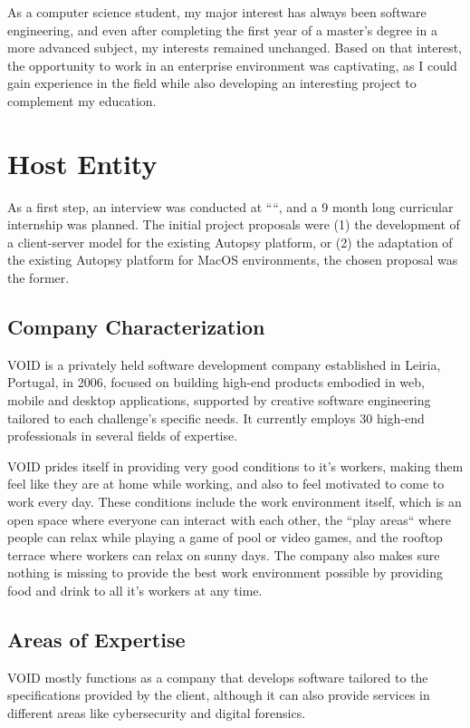 As a computer science student, my major interest has always been software engineering, and even after completing the first year of a master's degree in a more advanced subject, 
my interests remained unchanged. Based on that interest, the opportunity to work in an enterprise environment was captivating, as I could gain experience in the 
field while also developing an interesting project to complement my education.

\section{Host Entity}

As a first step, an interview was conducted at ``\company``, and a 9 month long curricular internship was planned. The initial project proposals were (1) the development of a 
client-server model for the existing Autopsy platform, or (2) the adaptation of the existing Autopsy platform for MacOS environments, the chosen proposal was the former.

\subsection{Company Characterization}

VOID is a privately held software development company established in Leiria, Portugal, in 2006, focused on building high-end products embodied in web, 
mobile and desktop applications, supported by creative software engineering tailored to each challenge's specific needs. 
It currently employs 30 high-end professionals in several fields of expertise.

VOID prides itself in providing very good conditions to it's workers, making them feel like they are at home while working,
and also to feel motivated to come to work every day. These conditions include the work environment itself, which is an open space where 
everyone can interact with each other, the ``play areas`` where people can relax while playing a game of pool or video games, and the rooftop terrace where workers can relax on sunny days.
The company also makes sure nothing is missing to provide the best work environment possible by providing food and drink to all it's workers at any time.

\subsection{Areas of Expertise}

VOID mostly functions as a company that develops software tailored to the specifications provided by the client, although 
it can also provide services in different areas like cybersecurity and digital forensics.

